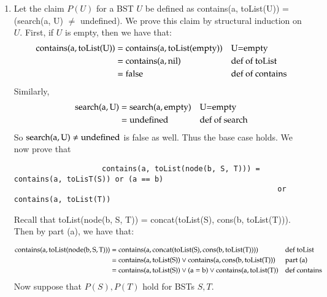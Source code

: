 \documentclass[12pt]{article}
\theoremstyle{definitionstyle}
\begin{document}
\begin{enumerate}[labelindent=0pt, labelwidth=!, wide]
\begin{enumerate}[leftmargin=0pt, label=(\alph*), labelindent=0pt, labelwidth=!, wide]
                \item Let the claim $P(U)$ for a BST $U$ be defined as contains(a, toList(U)) = (search(a, U) $\neq$ undefined). We prove this claim by structural induction on $U$. First, if $U$ is empty, then we have that:
                \begin{align*}
                    \begin{aligned}
                        \rm contains(a, toList(U)) &= \rm contains(a, toList(empty)) && \text{U=empty} \\
                        &= \rm contains(a, nil) && \text{def of toList} \\
                        &= \rm false && \text{def of contains}
                    \end{aligned}
                \end{align*}
                Similarly,
                \begin{align*}
                    \begin{aligned}
                        \rm search(a, U) &= \rm search(a, empty) && \text{U=empty} \\
                        &= \rm undefined && \text{def of search}
                    \end{aligned}
                \end{align*}
                So $\rm search(a, U) \neq undefined$ is false as well. Thus the base case holds. We now prove that 
                \begin{lstlisting}
                    contains(a, toList(node(b, S, T))) = contains(a, toLisT(S)) or (a == b) 
                                                            or contains(a, toList(T))
                \end{lstlisting}
                Recall that toList(node(b, S, T)) = concat(toList(S), cons(b, toList(T))). Then by part (a), we have that:
            
                \begin{align*}
                    \begin{aligned}
                        \rm contains(a, toList(node(b, S, T))) &= \rm contains(a, concat(toList(S), cons(b, toList(T)))) && \text{def toList} \\
                        &= \rm contains(a, toList(S)) \rm \lor \rm contains(a, cons(b, toList(T))) && \text{part (a)} \\
                        &= \rm contains(a, toList(S)) \rm \lor (a=b) \rm \lor \rm contains(a, toList(T)) && \text{def contains} \\
                    \end{aligned}
                \end{align*}
                Now suppose that $P(S), P(T)$ hold for BSTs $S, T$. 


\end{enumerate}
\end{enumerate}
\end{document}
